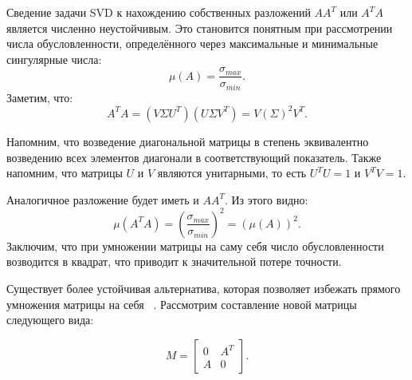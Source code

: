 



Сведение задачи SVD к нахождению собственных разложений \( A A^T \) или \( A^T A \) является численно неустойчивым. Это становится понятным при рассмотрении числа обусловленности, определённого через максимальные и минимальные сингулярные числа:
\[\mu(A) = \frac{\sigma_{max}}{\sigma_{min}}.\]
Заметим, что:
\[ A^TA=(V \Sigma U^T)(U \Sigma V^T)=V (\Sigma)^2V^T. \]

\begin{note}
    Напомним, что возведение диагональной матрицы в степень эквивалентно возведению всех элементов диагонали в соответствующий показатель. Также напомним, что матрицы \(U\) и \(V\) являются унитарными, то есть \(U^TU=1\) и \(V^TV=1\).
\end{note}

Аналогичное разложение будет иметь и \(AA^T\). Из этого видно:
\[ \mu(A^TA) = \left( \frac{\sigma_{max}}{\sigma_{min}} \right)^2 = (\mu(A))^2.\]
Заключим, что при умножении матрицы на саму себя число обусловленности возводится в квадрат, что приводит к значительной потере точности.

Существует более устойчивая альтернатива, которая позволяет избежать прямого умножения матрицы на себя ~\cite{mr3_algo4triagonal_sym_eigen_and_bidiagSVD}. Рассмотрим составление новой матрицы следующего вида:

\begin{equation}
M = \begin{bmatrix} 0 & A^T \\ A & 0 \end{bmatrix}.
\end{equation}

